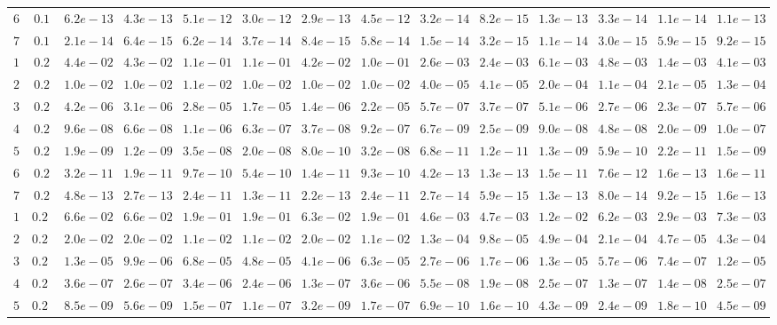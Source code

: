 \begin{tabular}{cccccccccccccc}
$6$ & $0.1$ & $6.2e-13$ & $4.3e-13$ & $5.1e-12$ & $3.0e-12$ & $2.9e-13$ & $4.5e-12$ & $3.2e-14$ & $8.2e-15$ & $1.3e-13$ & $3.3e-14$ & $1.1e-14$ & $1.1e-13$\\
$7$ & $0.1$ & $2.1e-14$ & $6.4e-15$ & $6.2e-14$ & $3.7e-14$ & $8.4e-15$ & $5.8e-14$ & $1.5e-14$ & $3.2e-15$ & $1.1e-14$ & $3.0e-15$ & $5.9e-15$ & $9.2e-15$\\
$1$ & $0.2$ & $4.4e-02$ & $4.3e-02$ & $1.1e-01$ & $1.1e-01$ & $4.2e-02$ & $1.0e-01$ & $2.6e-03$ & $2.4e-03$ & $6.1e-03$ & $4.8e-03$ & $1.4e-03$ & $4.1e-03$\\
$2$ & $0.2$ & $1.0e-02$ & $1.0e-02$ & $1.1e-02$ & $1.0e-02$ & $1.0e-02$ & $1.0e-02$ & $4.0e-05$ & $4.1e-05$ & $2.0e-04$ & $1.1e-04$ & $2.1e-05$ & $1.3e-04$\\
$3$ & $0.2$ & $4.2e-06$ & $3.1e-06$ & $2.8e-05$ & $1.7e-05$ & $1.4e-06$ & $2.2e-05$ & $5.7e-07$ & $3.7e-07$ & $5.1e-06$ & $2.7e-06$ & $2.3e-07$ & $5.7e-06$\\
$4$ & $0.2$ & $9.6e-08$ & $6.6e-08$ & $1.1e-06$ & $6.3e-07$ & $3.7e-08$ & $9.2e-07$ & $6.7e-09$ & $2.5e-09$ & $9.0e-08$ & $4.8e-08$ & $2.0e-09$ & $1.0e-07$\\
$5$ & $0.2$ & $1.9e-09$ & $1.2e-09$ & $3.5e-08$ & $2.0e-08$ & $8.0e-10$ & $3.2e-08$ & $6.8e-11$ & $1.2e-11$ & $1.3e-09$ & $5.9e-10$ & $2.2e-11$ & $1.5e-09$\\
$6$ & $0.2$ & $3.2e-11$ & $1.9e-11$ & $9.7e-10$ & $5.4e-10$ & $1.4e-11$ & $9.3e-10$ & $4.2e-13$ & $1.3e-13$ & $1.5e-11$ & $7.6e-12$ & $1.6e-13$ & $1.6e-11$\\
$7$ & $0.2$ & $4.8e-13$ & $2.7e-13$ & $2.4e-11$ & $1.3e-11$ & $2.2e-13$ & $2.4e-11$ & $2.7e-14$ & $5.9e-15$ & $1.3e-13$ & $8.0e-14$ & $9.2e-15$ & $1.6e-13$\\
$1$ & $0.25$ & $6.6e-02$ & $6.6e-02$ & $1.9e-01$ & $1.9e-01$ & $6.3e-02$ & $1.9e-01$ & $4.6e-03$ & $4.7e-03$ & $1.2e-02$ & $6.2e-03$ & $2.9e-03$ & $7.3e-03$\\
$2$ & $0.25$ & $2.0e-02$ & $2.0e-02$ & $1.1e-02$ & $1.1e-02$ & $2.0e-02$ & $1.1e-02$ & $1.3e-04$ & $9.8e-05$ & $4.9e-04$ & $2.1e-04$ & $4.7e-05$ & $4.3e-04$\\
$3$ & $0.25$ & $1.3e-05$ & $9.9e-06$ & $6.8e-05$ & $4.8e-05$ & $4.1e-06$ & $6.3e-05$ & $2.7e-06$ & $1.7e-06$ & $1.3e-05$ & $5.7e-06$ & $7.4e-07$ & $1.2e-05$\\
$4$ & $0.25$ & $3.6e-07$ & $2.6e-07$ & $3.4e-06$ & $2.4e-06$ & $1.3e-07$ & $3.6e-06$ & $5.5e-08$ & $1.9e-08$ & $2.5e-07$ & $1.3e-07$ & $1.4e-08$ & $2.5e-07$\\
$5$ & $0.25$ & $8.5e-09$ & $5.6e-09$ & $1.5e-07$ & $1.1e-07$ & $3.2e-09$ & $1.7e-07$ & $6.9e-10$ & $1.6e-10$ & $4.3e-09$ & $2.4e-09$ & $1.8e-10$ & $4.5e-09$\\

\end{tabular}
